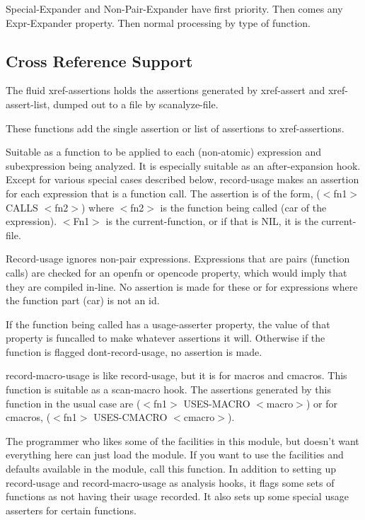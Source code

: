   Special-Expander and Non-Pair-Expander have first priority.
Then comes any Expr-Expander property. Then normal processing
by type of function.

\subsection{Cross Reference Support}

  The  fluid  xref-assertions  holds the assertions generated by
xref-assert and  xref-assert-list,  dumped  out  to  a  file  by
scanalyze-file.


{}
{}
  These functions add the single assertion or list of assertions
to xref-assertions.


{    Suitable  as  a  function to be applied to each (non-atomic)
    expression  and  subexpression  being  analyzed.     It   is
    especially  suitable as an after-expansion hook.  Except for
    various special cases described below, record-usage makes an
    assertion for each expression that is a function call.   The
    assertion is of the form, ($<$fn1$>$ CALLS $<$fn2$>$) where
				$<$fn2$>$ is the function being called (car of
    the expression). $<$Fn1$>$ is the current-function, or if 
    that is NIL, it is the current-file.
}

  Record-usage ignores non-pair expressions. Expressions that
are pairs (function calls) are checked for an openfn or opencode
property, which would imply that they are compiled in-line. No
assertion is  made for these or for expressions where the
function part (car) is not an id.

  If the function being called has a usage-asserter property,
the value of that property is funcalled to make whatever
assertions it will. Otherwise if the function is flagged
dont-record-usage, no assertion is made.


{    record-macro-usage is  like  record-usage,  but  it  is  for
    macros  and  cmacros.    This  function  is  suitable  as  a
    scan-macro hook.  The assertions generated by this  function
    in  the  usual  case  are  ($<$fn1$>$ USES-MACRO $<$macro$>$)
    or for cmacros, ($<$fn1$>$ USES-CMACRO $<$cmacro$>$).
}

{    The programmer who likes some  of  the  facilities  in  this
    module,  but  doesn't want everything here can just load the
    module.  If you want to  use  the  facilities  and  defaults
    available in the module, call this function.  In addition to
    setting  up  record-usage and record-macro-usage as analysis
    hooks, it flags some sets of functions as not  having  their
    usage  recorded.    It  also  sets  up  some  special  usage
    asserters for certain functions.
}

